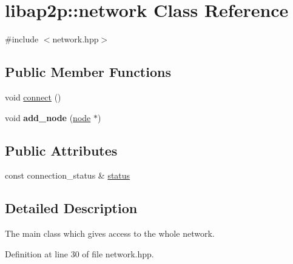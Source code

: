 \hypertarget{classlibap2p_1_1network}{\section{libap2p\-:\-:network Class Reference}
\label{classlibap2p_1_1network}
}


{\ttfamily \#include $<$network.\-hpp$>$}

\subsection*{Public Member Functions}
\begin{DoxyCompactItemize}
\item 
void \hyperlink{classlibap2p_1_1network_a0cf3ffa14a7fbad863b3db1d07382353}{connect} ()
\item 
\hypertarget{classlibap2p_1_1network_a721b9df35da2eb2797bd2262e5525b14}{void {\bfseries add\-\_\-node} (\hyperlink{classlibap2p_1_1node}{node} $\ast$)}\label{classlibap2p_1_1network_a721b9df35da2eb2797bd2262e5525b14}

\end{DoxyCompactItemize}
\subsection*{Public Attributes}
\begin{DoxyCompactItemize}
\item 
const connection\-\_\-status \& \hyperlink{classlibap2p_1_1network_abfb873c8068ef8b200c89cc6fb7bb372}{status}
\end{DoxyCompactItemize}


\subsection{Detailed Description}
The main class which gives access to the whole network. 

Definition at line 30 of file network.\-hpp.



